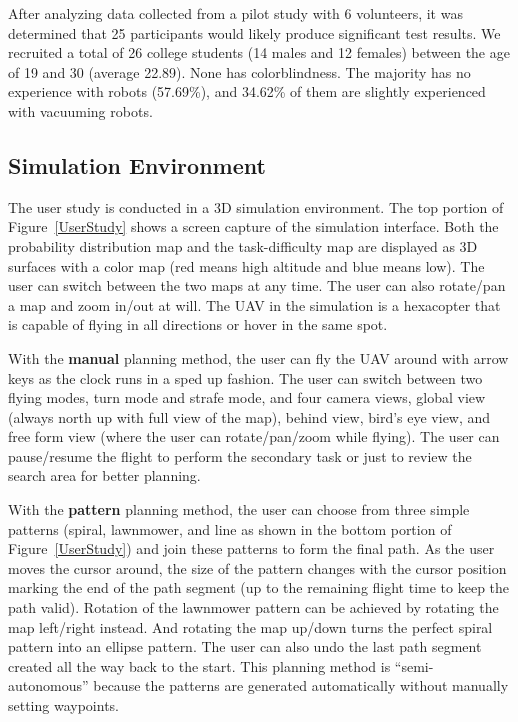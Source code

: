 \documentclass[lettersize, apacite, twoside, HRI]{apa_HRI}
\begin{document}
After analyzing data collected from a pilot study with 6 volunteers, it was determined that 25 participants would likely produce significant test results. We recruited a total of 26 college students (14 males and 12 females) between the age of 19 and 30 (average 22.89). None has colorblindness. The majority has no experience with robots (57.69\%), and 34.62\% of them are slightly experienced with vacuuming robots.

\subsection{Simulation Environment}

The user study is conducted in a 3D simulation environment. The top portion of Figure~\ref{UserStudy} shows a screen capture of the simulation interface. Both the probability distribution map and the task-difficulty map are displayed as 3D surfaces with a color map (red means high altitude and blue means low). The user can switch between the two maps at any time. The user can also rotate/pan a map and zoom in/out at will. The UAV in the simulation is a hexacopter that is capable of flying in all directions or hover in the same spot.

With the \textbf{manual} planning method, the user can fly the UAV around with arrow keys as the clock runs in a sped up fashion. The user can switch between two flying modes, turn mode and strafe mode, and four camera views, global view (always north up with full view of the map), behind view, bird's eye view, and free form view (where the user can rotate/pan/zoom while flying). The user can pause/resume the flight to perform the secondary task or just to review the search area for better planning.

With the \textbf{pattern} planning method, the user can choose from three simple patterns (spiral, lawnmower, and line as shown in the bottom portion of Figure~\ref{UserStudy}) and join these patterns to form the final path. As the user moves the cursor around, the size of the pattern changes with the cursor position marking the end of the path segment (up to the remaining flight time to keep the path valid). Rotation of the lawnmower pattern can be achieved by rotating the map left/right instead. And rotating the map up/down turns the perfect spiral pattern into an ellipse pattern. The user can also undo the last path segment created all the way back to the start. This planning method is ``semi-autonomous'' because the patterns are generated automatically without manually setting waypoints.
\end{document}
